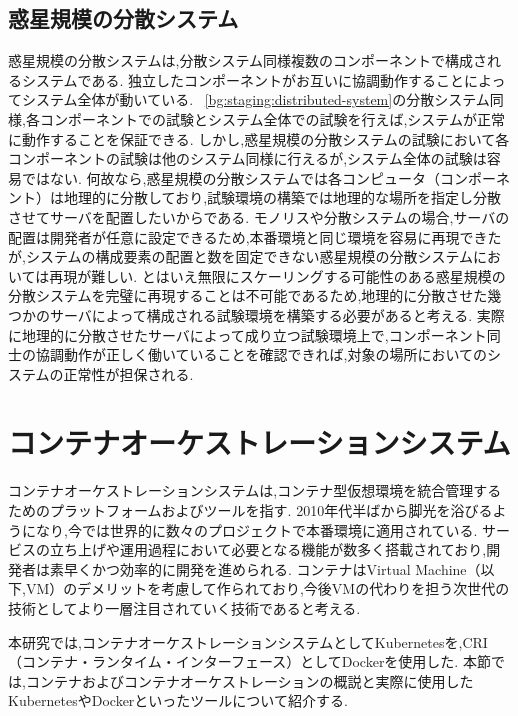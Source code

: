 \subsection{惑星規模の分散システム}
\label{bg:staging:planetary-scale-distributed-system}

惑星規模の分散システムは,分散システム同様複数のコンポーネントで構成されるシステムである.
独立したコンポーネントがお互いに協調動作することによってシステム全体が動いている.
~\ref{bg:staging:distributed-system}の分散システム同様,各コンポーネントでの試験とシステム全体での試験を行えば,システムが正常に動作することを保証できる.
しかし,惑星規模の分散システムの試験において各コンポーネントの試験は他のシステム同様に行えるが,システム全体の試験は容易ではない.
何故なら,惑星規模の分散システムでは各コンピュータ（コンポーネント）は地理的に分散しており,試験環境の構築では地理的な場所を指定し分散させてサーバを配置したいからである.
モノリスや分散システムの場合,サーバの配置は開発者が任意に設定できるため,本番環境と同じ環境を容易に再現できたが,システムの構成要素の配置と数を固定できない惑星規模の分散システムにおいては再現が難しい.
とはいえ無限にスケーリングする可能性のある惑星規模の分散システムを完璧に再現することは不可能であるため,地理的に分散させた幾つかのサーバによって構成される試験環境を構築する必要があると考える.
実際に地理的に分散させたサーバによって成り立つ試験環境上で,コンポーネント同士の協調動作が正しく働いていることを確認できれば,対象の場所においてのシステムの正常性が担保される.

\section{コンテナオーケストレーションシステム}
\label{background:container-orchestration-system}

コンテナオーケストレーションシステムは,コンテナ型仮想環境を統合管理するためのプラットフォームおよびツールを指す.
2010年代半ばから脚光を浴びるようになり,今では世界的に数々のプロジェクトで本番環境に適用されている.
サービスの立ち上げや運用過程において必要となる機能が数多く搭載されており,開発者は素早くかつ効率的に開発を進められる.
コンテナはVirtual Machine（以下,VM）のデメリットを考慮して作られており,今後VMの代わりを担う次世代の技術としてより一層注目されていく技術であると考える.

本研究では,コンテナオーケストレーションシステムとしてKubernetesを,CRI（コンテナ・ランタイム・インターフェース）としてDockerを使用した.
本節では,コンテナおよびコンテナオーケストレーションの概説と実際に使用したKubernetesやDockerといったツールについて紹介する.

